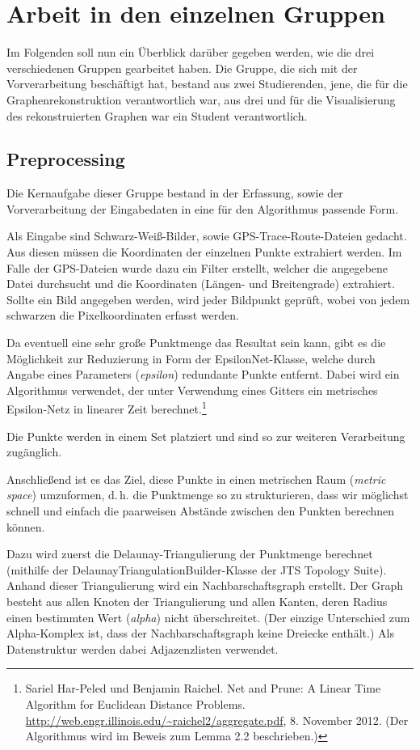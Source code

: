 \documentclass[parskip=half,
 fontsize=12pt, bibtotoc,
 ngerman]
 {article}
\begin{document}
\section{Arbeit in den einzelnen Gruppen}
Im Folgenden soll nun ein Überblick darüber gegeben werden, wie die drei verschiedenen Gruppen gearbeitet haben. Die Gruppe, die sich mit der Vorverarbeitung beschäftigt hat, bestand aus zwei Studierenden, jene, die für die Graphenrekonstruktion verantwortlich war, aus drei und für die Visualisierung des rekonstruierten Graphen war ein Student verantwortlich.

\subsection{Preprocessing}
Die Kernaufgabe dieser Gruppe bestand in der Erfassung, sowie der Vorverarbeitung der Eingabedaten in eine für den Algorithmus passende Form.

Als Eingabe sind Schwarz-Weiß-Bilder, sowie GPS-Trace-Route-Dateien gedacht. Aus diesen müssen die Koordinaten der einzelnen Punkte extrahiert werden. Im Falle der GPS-Dateien wurde dazu ein Filter erstellt, welcher die angegebene Datei durchsucht und die Koordinaten (Längen- und Breitengrade) extrahiert. Sollte ein Bild angegeben werden, wird jeder Bildpunkt geprüft, wobei von jedem schwarzen die Pixelkoordinaten erfasst werden.

Da eventuell eine sehr große Punktmenge das Resultat sein kann, gibt es die Möglichkeit zur Reduzierung in Form der EpsilonNet-Klasse, welche durch Angabe eines Parameters (\emph{epsilon}) redundante Punkte entfernt. Dabei wird ein Algorithmus verwendet, der unter Verwendung eines Gitters ein metrisches Epsilon-Netz in linearer Zeit berechnet.\footnote{Sariel Har-Peled und Benjamin Raichel. Net and Prune: A Linear Time Algorithm for Euclidean Distance Problems. \url{http://web.engr.illinois.edu/~raichel2/aggregate.pdf}, 8. November 2012. (Der Algorithmus wird im Beweis zum Lemma 2.2 beschrieben.)}

Die Punkte werden in einem Set platziert und sind so zur weiteren Verarbeitung zugänglich.

Anschließend ist es das Ziel, diese Punkte in einen metrischen Raum (\textit{metric space}) umzuformen, d.\,h. die Punktmenge so zu strukturieren, dass wir möglichst schnell und einfach die paarweisen Abstände zwischen den Punkten berechnen können.

Dazu wird zuerst die Delaunay-Triangulierung der Punktmenge berechnet (mithilfe der Delaunay\allowbreak TriangulationBuilder-Klasse der JTS Topology Suite). Anhand dieser Triangulierung wird ein Nachbarschaftsgraph erstellt. Der Graph besteht aus allen Knoten der Triangulierung und allen Kanten, deren Radius einen bestimmten Wert (\emph{alpha}) nicht überschreitet. (Der einzige Unterschied zum Alpha-Komplex ist, dass der Nachbarschaftsgraph keine Dreiecke enthält.) Als Datenstruktur werden dabei Adjazenzlisten verwendet.
\end{document}
